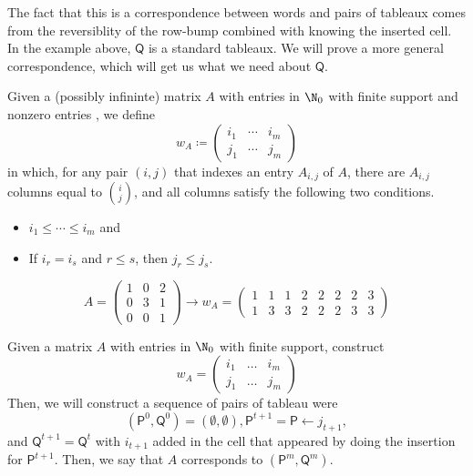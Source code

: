 \documentclass[11pt,leqno,oneside]{amsart}
\numberwithin{thm}{section}
\newcommand{\TP}{\mathsf{P}}
\newcommand{\TQ}{\mathsf{Q}}
\newcommand{\defeq}{\coloneqq}
\begin{document}
The fact that this is a correspondence between words and pairs of
tableaux comes from the reversiblity of the row-bump combined with
knowing the inserted cell. In the example above, \(\TQ\) is a standard
tableaux. We will prove a more general correspondence, which will get
us what we need about \(\TQ\).
\begin{defn}
  Given a (possibly infininte) matrix \(A\) with entries in \(\N_0\)
  with finite support and nonzero entries , we define \[
    w_A \defeq \left(
      \begin{array}{ccc}
        i_1& \cdots &i_m\\
        j_1& \cdots &j_m
      \end{array}
    \right)
  \]
  in which, for any pair \((i,j)\) that indexes an entry \(A_{i,j}\)
  of \(A\), there are \(A_{i,j}\) columns equal to \(\binom{i}{j}\),
  and all columns satisfy the following two conditions.
  \begin{itemize}
  \item \(i_1 \leq \cdots \leq i_m\) and
  \item If \(i_r = i_s\) and \(r \leq s\), then \(j_r \leq j_s\).
  \end{itemize}
\end{defn}
\begin{example}
  \[
    A = \left(
      \begin{array}{ccc}
        1&0&2\\
        0&3&1\\
        0&0&1
      \end{array}
    \right) \rightarrow w_A = \left(
      \begin{array}{cccccccc}
        1&1&1&2&2&2&2&3\\
        1&3&3&2&2&2&3&3
      \end{array}
    \right)
  \]
\end{example}
\begin{defn}
  Given a matrix \(A\) with entries in \(\N_0\) with finite support,
  construct \[
    w_A = \left(
      \begin{array}{ccc}
        i_1&\ldots&i_m\\
        j_1&\ldots&j_m
      \end{array}
    \right)
  \]
  Then, we will construct a sequence of pairs of tableau were \[
    (\TP^0, \TQ^0) = (\emptyset, \emptyset), \TP^{t+1} = \TP
    \leftarrow j_{t+1}, 
  \]
  and \(\TQ^{t+1} = \TQ^t\) with \(i_{t+1}\) added
  in the cell that appeared by doing the insertion for
  \(\TP^{t+1}\). Then, we say that \(A\) corresponds to \((\TP^m, \TQ^m)\).
\end{defn}
\end{document}

